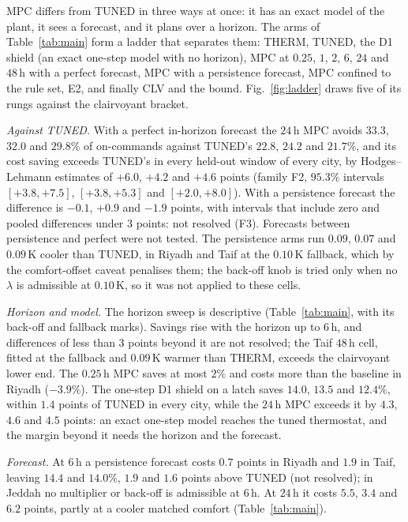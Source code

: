 \documentclass[pdflatex,sn-mathphys-num,iicol]{sn-jnl}
\theoremstyle{thmstyleone}\newtheorem{proposition}{Proposition}\newtheorem{corollary}{Corollary}
\theoremstyle{thmstyletwo}\newtheorem{remark}{Remark}\newtheorem{observation}{Observation}
\theoremstyle{thmstylethree}\newtheorem{definition}{Definition}
\begin{document}
MPC differs from TUNED in three ways at once: it has an exact model of the plant, it sees a forecast, and it plans over a horizon. The arms of Table~\ref{tab:main} form a ladder that separates them: THERM, TUNED, the D1 shield (an exact one-step model with no horizon), MPC at $0.25$, $1$, $2$, $6$, $24$ and $48\,$h with a perfect forecast, MPC with a persistence forecast, MPC confined to the rule set, E2, and finally CLV and the bound. Fig.~\ref{fig:ladder} draws five of its rungs against the clairvoyant bracket.



\emph{Against TUNED.} With a perfect in-horizon forecast the $24\,$h MPC avoids $33.3$, $32.0$ and $29.8\%$ of on-commands against TUNED's $22.8$, $24.2$ and $21.7\%$, and its cost saving exceeds TUNED's in every held-out window of every city, by Hodges--Lehmann estimates of $+6.0$, $+4.2$ and $+4.6$ points (family F2, $95.3\%$ intervals $[+3.8,+7.5]$, $[+3.8,+5.3]$ and $[+2.0,+8.0]$). With a persistence forecast the difference is $-0.1$, $+0.9$ and $-1.9$ points, with intervals that include zero and pooled differences under $3$ points: not resolved (F3). Forecasts between persistence and perfect were not tested. The persistence arms run $0.09$, $0.07$ and $0.09\,$K cooler than TUNED, in Riyadh and Taif at the $0.10\,$K fallback, which by the comfort-offset caveat penalises them; the back-off knob is tried only when no $\lambda$ is admissible at $0.10\,$K, so it was not applied to these cells.

\emph{Horizon and model.} The horizon sweep is descriptive (Table~\ref{tab:main}, with its back-off and fallback marks). Savings rise with the horizon up to $6\,$h, and differences of less than $3$ points beyond it are not resolved; the Taif $48\,$h cell, fitted at the fallback and $0.09\,$K warmer than THERM, exceeds the clairvoyant lower end. The $0.25\,$h MPC saves at most $2\%$ and costs more than the baseline in Riyadh ($-3.9\%$). The one-step D1 shield on a latch saves $14.0$, $13.5$ and $12.4\%$, within $1.4$ points of TUNED in every city, while the $24\,$h MPC exceeds it by $4.3$, $4.6$ and $4.5$ points: an exact one-step model reaches the tuned thermostat, and the margin beyond it needs the horizon and the forecast.

\emph{Forecast.} At $6\,$h a persistence forecast costs $0.7$ points in Riyadh and $1.9$ in Taif, leaving $14.4$ and $14.0\%$, $1.9$ and $1.6$ points above TUNED (not resolved); in Jeddah no multiplier or back-off is admissible at $6\,$h. At $24\,$h it costs $5.5$, $3.4$ and $6.2$ points, partly at a cooler matched comfort (Table~\ref{tab:main}).
\end{document}
